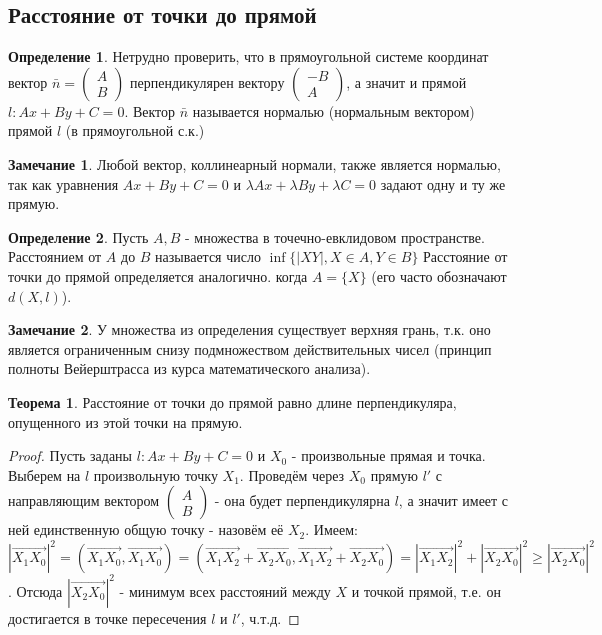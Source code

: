 \documentclass[a4paper, 12pt]{article}
\theoremstyle{definition}
\newtheorem*{definition}{Определение}
\newtheorem*{theorem}{Теорема}
\newtheorem*{remark}{Замечание}
\begin{document}
	\subsection{Расстояние от точки до прямой}
	\begin{definition}
		Нетрудно проверить, что в прямоугольной системе координат вектор $\bar{n} = \begin{pmatrix} A \\ B \end{pmatrix}$ перпендикулярен вектору $\begin{pmatrix} -B \\ A \end{pmatrix}$, а значит и прямой $l: Ax + By + C = 0$. Вектор $\bar{n}$ называется нормалью (нормальным вектором) прямой $l$ (в прямоугольной с.к.)
	\end{definition}
	\begin{remark}
		Любой вектор, коллинеарный нормали, также является нормалью, так как уравнения $Ax + By + C = 0$ и $\lambda Ax + \lambda By + \lambda C = 0$ задают одну и ту же прямую.
	\end{remark}
	\begin{definition}
		Пусть $A, B$  - множества в точечно-евклидовом пространстве. Расстоянием от $A$ до $B$ называется число $\inf\{|XY|, X\in A, Y\in B\}$ Расстояние от точки до прямой определяется аналогично. когда $A = \{X\}$ (его часто обозначают $d(X, l)$).
	\end{definition}
	\begin{remark}
		У множества из определения существует верхняя грань, т.к. оно является ограниченным снизу подмножеством действительных чисел (принцип полноты Вейерштрасса из курса математического анализа). 
	\end{remark}
	\begin{theorem}
		Расстояние от точки до прямой равно длине перпендикуляра, опущенного из этой точки на прямую.
	\end{theorem}
	\begin{proof}
		Пусть заданы $l: Ax + By + C = 0$ и $X_{0}$ - произвольные прямая и точка. Выберем на $l$ произвольную точку $X_{1}$. Проведём через $X_{0}$ прямую $l'$ с направляющим вектором $\begin{pmatrix} A \\ B \end{pmatrix}$  - она будет перпендикулярна $l$, а значит имеет с ней единственную общую точку - назовём её $X_{2}$. Имеем: $|\overrightarrow{X_{1}X_{0}}|^2 = (\overrightarrow{X_{1}X_{0}}, \overrightarrow{X_{1}X_{0}}) = (\overrightarrow{X_{1}X_{2}} + \overrightarrow{X_{2}X_{0}}, \overrightarrow{X_{1}X_{2}} + \overrightarrow{X_{2}X_{0}}) = |\overrightarrow{X_{1}X_{2}}|^2 + |\overrightarrow{X_{2}X_{0}}|^2 \geqslant |\overrightarrow{X_{2}X_{0}}|^2$. Отсюда $|\overrightarrow{X_{2}X_{0}}|^2$ - минимум всех расстояний между $X$ и точкой прямой, т.е. он достигается в точке пересечения $l$ и $l'$, ч.т.д.
	\end{proof}
\end{document}
